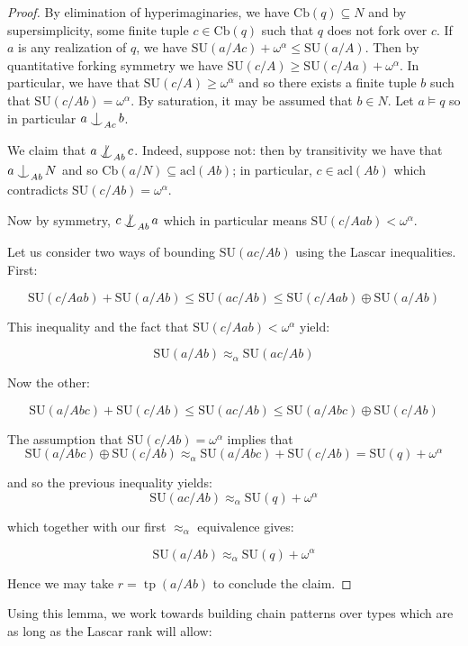 \documentclass{article}
\DeclareMathOperator{\Ind}{Ind}
\DeclareMathOperator{\tp}{tp}
\def\Ind#1#2{#1\setbox0=\hbox{$#1x$}\kern\wd0\hbox to 0pt{\hss$#1\mid$\hss}
\lower.9\ht0\hbox to 0pt{\hss$#1\smile$\hss}\kern\wd0}
\def\ind{\mathop{\mathpalette\Ind{}}}
\def\notind#1#2{#1\setbox0=\hbox{$#1x$}\kern\wd0
\hbox to 0pt{\mathchardef\nn=12854\hss$#1\nn$\kern1.4\wd0\hss}
\hbox to 0pt{\hss$#1\mid$\hss}\lower.9\ht0 \hbox to 0pt{\hss$#1\smile$\hss}\kern\wd0}
\def\nind{\mathop{\mathpalette\notind{}}}
\theoremstyle{remark}
\theoremstyle{definition}
\begin{document}
\begin{proof}
    By elimination of hyperimaginaries, we have $\mathrm{Cb}(q)\subseteq N$ and by supersimplicity, some finite tuple $c\in \mathrm{Cb}(q)$ such that $q$ does not fork over $c$. If $a$ is any realization of $q$, we have $\mathrm{SU}(a/Ac)+\omega^\alpha\leq\mathrm{SU}(a/A)$. Then by quantitative forking symmetry we have $\mathrm{SU}(c/A)\geq \mathrm{SU}(c/Aa)+\omega^\alpha$. In particular, we have that $\mathrm{SU}(c/A)\geq \omega^\alpha$ and so there exists a finite tuple $b$ such that $\mathrm{SU}(c/Ab)=\omega^\alpha$. By saturation, it may be assumed that $b\in N$. Let $a\models q$ so in particular $a\ind_{Ac}b$.

We claim that $a\nind_{Ab} c$. Indeed, suppose not: then by transitivity we have that $a\ind_{Ab} N$ and so $\mathrm{Cb}(a/N)\subseteq \mathrm{acl}(Ab)$; in particular, $c\in \mathrm{acl}(Ab)$ which contradicts $\mathrm{SU}(c/Ab)=\omega^\alpha$.

Now by symmetry, $c\nind_{Ab} a$ which in particular means $\mathrm{SU}(c/Aab)<\omega^\alpha$.

Let us consider two ways of bounding $\mathrm{SU}(ac/Ab)$ using the Lascar inequalities. First:

\[\mathrm{SU}(c/Aab)+\mathrm{SU}(a/Ab)\leq\mathrm{SU}(ac/Ab)\leq\mathrm{SU}(c/Aab)\oplus\mathrm{SU}(a/Ab)\]

This inequality and the fact that $\mathrm{SU}(c/Aab)<\omega^\alpha$ yield:

\[\mathrm{SU}(a/Ab)\approx_\alpha\mathrm{SU}(ac/Ab)\]

Now the other:

\[\mathrm{SU}(a/Abc)+\mathrm{SU}(c/Ab)\leq\mathrm{SU}(ac/Ab)\leq\mathrm{SU}(a/Abc)\oplus\mathrm{SU}(c/Ab)\]

The assumption that $\mathrm{SU}(c/Ab)=\omega^\alpha$ implies that 
\[\mathrm{SU}(a/Abc)\oplus\mathrm{SU}(c/Ab)\approx_\alpha\mathrm{SU}(a/Abc)+\mathrm{SU}(c/Ab)=\mathrm{SU}(q)+\omega^\alpha\]

and so the previous inequality yields:
\[\mathrm{SU}(ac/Ab)\approx_\alpha\mathrm{SU}(q)+\omega^\alpha\]

which together with our first $\approx_\alpha$ equivalence gives:

\[\mathrm{SU}(a/Ab)\approx_\alpha\mathrm{SU}(q)+\omega^\alpha\]

Hence we may take $r=\tp(a/Ab)$ to conclude the claim.
\end{proof}

Using this lemma, we work towards building chain patterns over types which are as long as the Lascar rank will allow:
\end{document}
